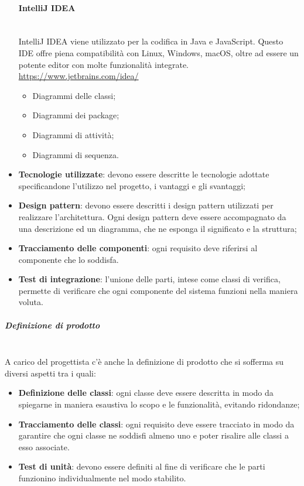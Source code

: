 \begin{itemize}
\paragraph{IntelliJ IDEA} \mbox{}\\
IntelliJ IDEA viene utilizzato per la codifica in Java e JavaScript. Questo IDE offre piena compatibilità con Linux, Windows, macOS, oltre ad essere un potente editor con molte funzionalità integrate.
\url{https://www.jetbrains.com/idea/}
				\begin{itemize}
					\item Diagrammi delle classi;
					\item Diagrammi dei package;
					\item Diagrammi di attività;
					\item Diagrammi di sequenza.
				\end{itemize}
				\item \textbf{Tecnologie utilizzate}: devono essere descritte le tecnologie adottate specificandone l'utilizzo nel progetto, i vantaggi e gli svantaggi;
				\item \textbf{Design pattern}: devono essere descritti i design pattern utilizzati per realizzare l'architettura. Ogni design pattern deve essere accompagnato da una descrizione ed un diagramma, che ne esponga il significato e la struttura;
				\item \textbf{Tracciamento delle componenti}: ogni requisito deve riferirsi al componente che lo soddisfa.
				\item \textbf{Test di integrazione}: l'unione delle parti, intese come classi di verifica, permette di verificare che ogni componente del sistema funzioni nella maniera voluta.
			\end{itemize}
			\subparagraph{Definizione di prodotto} \mbox{}\\
			A carico del progettista c'è anche la definizione di prodotto che si sofferma su diversi aspetti tra i quali:
			\begin{itemize}
				\item \textbf{Definizione delle classi}: ogni classe deve essere descritta in modo da spiegarne in maniera esaustiva lo scopo e le funzionalità, evitando ridondanze;
				\item \textbf{Tracciamento delle classi}: ogni requisito deve essere tracciato in modo da garantire che ogni classe ne soddisfi almeno uno e poter risalire alle classi a esso associate.
				\item \textbf{Test di unità}: devono essere definiti al fine di verificare che le parti funzionino individualmente nel modo stabilito.
			\end{itemize}
